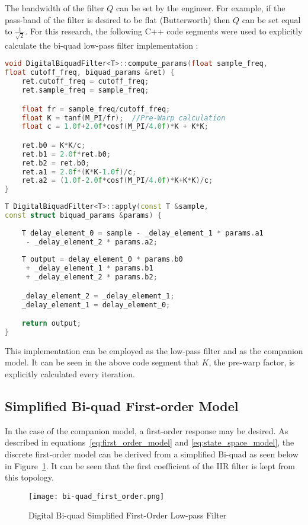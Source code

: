 The bandwidth of the filter $Q$ can be set by the engineer.  For example, if the pass-band of the filter is desired to be flat (Butterworth) then $Q$ can be set equal to $\frac{1}{\sqrt{2}}$.  For this research, the following C++ code segments were used to explicitly calculate the bi-quad low-pass filter implementation \cite{apm_source_code}: \newline

\begin{lstlisting}[language=c++]
void DigitalBiquadFilter<T>::compute_params(float sample_freq, 
float cutoff_freq, biquad_params &ret) {
    ret.cutoff_freq = cutoff_freq;
    ret.sample_freq = sample_freq;

    float fr = sample_freq/cutoff_freq;
    float K = tanf(M_PI/fr);  //Pre-Warp calculation
    float c = 1.0f+2.0f*cosf(M_PI/4.0f)*K + K*K;

    ret.b0 = K*K/c;
    ret.b1 = 2.0f*ret.b0;
    ret.b2 = ret.b0;
    ret.a1 = 2.0f*(K*K-1.0f)/c;
    ret.a2 = (1.0f-2.0f*cosf(M_PI/4.0f)*K+K*K)/c;
}
\end{lstlisting}

\begin{lstlisting}[language=c++]
T DigitalBiquadFilter<T>::apply(const T &sample, 
const struct biquad_params &params) {
    
    T delay_element_0 = sample - _delay_element_1 * params.a1 
     - _delay_element_2 * params.a2;
    
    T output = delay_element_0 * params.b0 
     + _delay_element_1 * params.b1 
     + _delay_element_2 * params.b2;

    _delay_element_2 = _delay_element_1;
    _delay_element_1 = delay_element_0;

    return output;
}

\end{lstlisting}

This implementation can be employed as the \Lone low-pass filter and as the companion model.  It can be seen in the above code segment that $K$, the pre-warp factor, is explicitly calculated every iteration.

\subsection{Simplified Bi-quad First-order Model}

In the case of the companion model, a first-order response may be desired.  As described in equations~\ref{eq:first_order_model} and \ref{eq:state_space_model}, the discrete first-order model can be derived from a simplified Bi-quad as seen below in Figure~\ref{fig:bi-quad_first_order}.  It can be seen that the first coefficient of the \ac{IIR} filter is kept from this topology.
\begin{figure}[h!]
 \centering
  \texttt{[image: bi-quad\_first\_order.png]}
  \caption{Digital Bi-quad Simplified First-Order Low-pass Filter }
  \label{fig:bi-quad_first_order}
\end{figure}

